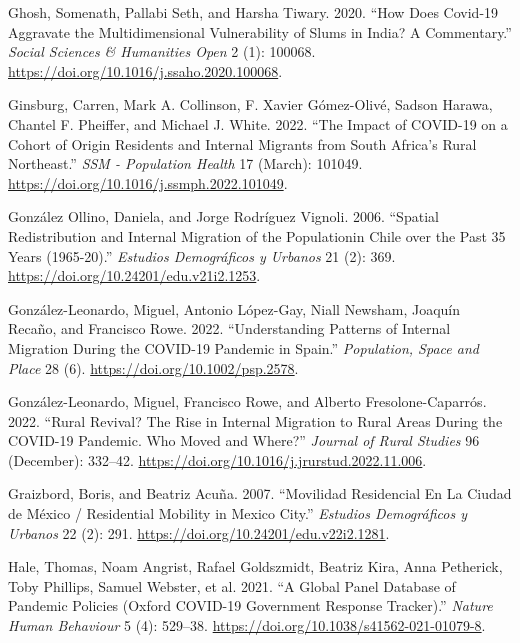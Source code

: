 \documentclass[
  10pt,
  letterpaper,
  DIV=11,
  numbers=noendperiod]{scrartcl}
\newlength{\cslhangindent}
\newlength{\cslentryspacingunit} %
\newenvironment{CSLReferences}[2] %
 {%
  \setlength{\parindent}{0pt}
  \ifodd #1
  \let\oldpar\par
  \def\par{\hangindent=\cslhangindent\oldpar}
  \fi
  \setlength{\parskip}{#2\cslentryspacingunit}
 }%
 {}
\begin{document}
\begin{CSLReferences}{1}{0}
\leavevmode{}%
Ghosh, Somenath, Pallabi Seth, and Harsha Tiwary. 2020. {``How Does
Covid-19 Aggravate the Multidimensional Vulnerability of Slums in India?
A Commentary.''} \emph{Social Sciences \& Humanities Open} 2 (1):
100068. \url{https://doi.org/10.1016/j.ssaho.2020.100068}.

\leavevmode{}%
Ginsburg, Carren, Mark A. Collinson, F. Xavier Gómez-Olivé, Sadson
Harawa, Chantel F. Pheiffer, and Michael J. White. 2022. {``The Impact
of COVID-19 on a Cohort of Origin Residents and Internal Migrants from
South Africa's Rural Northeast.''} \emph{SSM - Population Health} 17
(March): 101049. \url{https://doi.org/10.1016/j.ssmph.2022.101049}.

\leavevmode{}%
González Ollino, Daniela, and Jorge Rodríguez Vignoli. 2006. {``Spatial
Redistribution and Internal Migration of the Populationin Chile over the
Past 35 Years (1965-20).''} \emph{Estudios Demográficos y Urbanos} 21
(2): 369. \url{https://doi.org/10.24201/edu.v21i2.1253}.

\leavevmode{}%
González-Leonardo, Miguel, Antonio López-Gay, Niall Newsham, Joaquín
Recaño, and Francisco Rowe. 2022. {``Understanding Patterns of Internal
Migration During the COVID{-}19 Pandemic in Spain.''} \emph{Population,
Space and Place} 28 (6). \url{https://doi.org/10.1002/psp.2578}.

\leavevmode{}%
González-Leonardo, Miguel, Francisco Rowe, and Alberto
Fresolone-Caparrós. 2022. {``Rural Revival? The Rise in Internal
Migration to Rural Areas During the COVID-19 Pandemic. Who Moved and
Where?''} \emph{Journal of Rural Studies} 96 (December): 332--42.
\url{https://doi.org/10.1016/j.jrurstud.2022.11.006}.

\leavevmode{}%
Graizbord, Boris, and Beatriz Acuña. 2007. {``Movilidad Residencial En
La Ciudad de México / Residential Mobility in Mexico City.''}
\emph{Estudios Demográficos y Urbanos} 22 (2): 291.
\url{https://doi.org/10.24201/edu.v22i2.1281}.

\leavevmode{}%
Hale, Thomas, Noam Angrist, Rafael Goldszmidt, Beatriz Kira, Anna
Petherick, Toby Phillips, Samuel Webster, et al. 2021. {``A Global Panel
Database of Pandemic Policies (Oxford COVID-19 Government Response
Tracker).''} \emph{Nature Human Behaviour} 5 (4): 529--38.
\url{https://doi.org/10.1038/s41562-021-01079-8}.


\end{CSLReferences}
\end{document}
